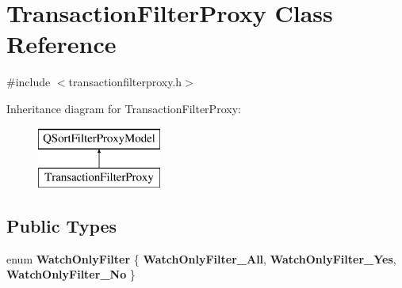 \hypertarget{class_transaction_filter_proxy}{}\section{Transaction\+Filter\+Proxy Class Reference}
\label{class_transaction_filter_proxy}


{\ttfamily \#include $<$transactionfilterproxy.\+h$>$}

Inheritance diagram for Transaction\+Filter\+Proxy\+:\begin{figure}[H]
\begin{center}
\leavevmode
\includegraphics[height=2.000000cm]{class_transaction_filter_proxy}
\end{center}
\end{figure}
\subsection*{Public Types}
\begin{DoxyCompactItemize}
\item 
\mbox{\label{class_transaction_filter_proxy_ab41d9f1ee436dd8f037eeca709c2b472}} 
enum {\bfseries Watch\+Only\+Filter} \{ {\bfseries Watch\+Only\+Filter\+\_\+\+All}, 
{\bfseries Watch\+Only\+Filter\+\_\+\+Yes}, 
{\bfseries Watch\+Only\+Filter\+\_\+\+No}
 \}
\end{DoxyCompactItemize}
